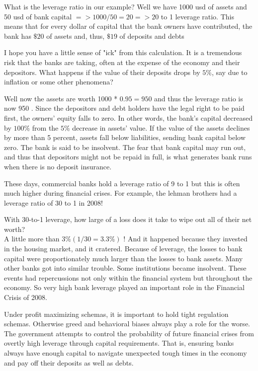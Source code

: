 \documentclass[10pt]{article}
\begin{document}
What is the leverage ratio in our example? Well we have 1000 usd of assets and 50 usd of bank capital $=>1000 / 50=20=>20$ to 1 leverage ratio. This means that for every dollar of capital that the bank owners have contributed, the bank has $\$ 20$ of assets and, thus, $\$ 19$ of deposits and debts

I hope you have a little sense of "ick" from this calculation. It is a tremendous risk that the banks are taking, often at the expense of the economy and their depositors. What happens if the value of their deposits drops by $5 \%$, say due to inflation or some other phenomena?

Well now the assets are worth 1000 * $0.95=950$ and thus the leverage ratio is now 950 . Since the depositors and debt holders have the legal right to be paid first, the owners' equity falls to zero. In other words, the bank's capital decreased by $100 \%$ from the $5 \%$ decrease in assets' value. If the value of the assets declines by more than 5 percent, assets fall below liabilities, sending bank capital below zero. The bank is said to be insolvent. The fear that bank capital may run out, and thus that depositors might not be repaid in full, is what generates bank runs when there is no deposit insurance.

These days, commercial banks hold a leverage ratio of 9 to 1 but this is often much higher during financial crises. For example, the lehman brothers had a leverage ratio of 30 to 1 in 2008!

With 30-to-1 leverage, how large of a loss does it take to wipe out all of their net worth?\\
A little more than $3 \%(1 / 30=3.3 \%)$ ! And it happened because they invested in the housing market, and it cratered. Because of leverage, the losses to bank capital were proportionately much larger than the losses to bank assets. Many other banks got into similar trouble. Some institutions became insolvent. These events had repercussions not only within the financial system but throughout the economy. So very high bank leverage played an important role in the Financial Crisis of 2008.

Under profit maximizing schemas, it is important to hold tight regulation schemas. Otherwise greed and behavioral biases always play a role for the worse. The government attempts to control the probability of future financial crises from overtly high leverage through capital requirements. That is, ensuring banks always have enough capital to navigate unexpected tough times in the economy and pay off their deposits as well as debts.
\end{document}
